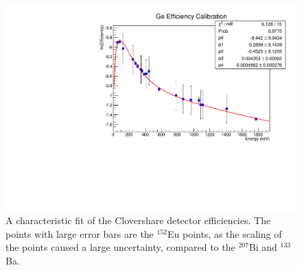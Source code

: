 \begin{figure}
    \centering
    \includegraphics[scale=0.7]{Setup_Figs/Clover1_Eff_05232017.pdf}
    \caption{A characteristic fit of the Clovershare detector efficiencies. The points with large error bars are the $^{152}$Eu points, as the scaling of the points caused a large uncertainty, compared to the $^{207}$Bi and $^{133}$Ba.}
    \label{fig:clover_eff}
\end{figure}